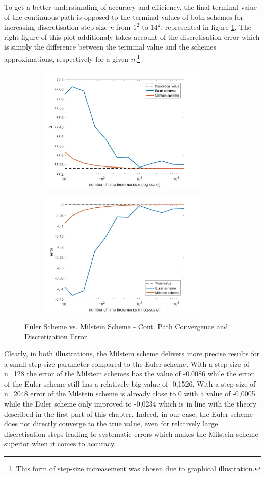 \documentclass[a4paper,11pt]{article}
\begin{document}
To get a better understanding of accuracy and efficiency, the final terminal value of the continuous path is opposed to the terminal values of both schemes for increasing discretisation step size \textit{n} from $1^2$ to $14^{2}$, represented in figure \ref{plot2}. The right figure of this plot additionaly takes account of the discretisation error which is simply the difference between the terminal value and the schemes approximations, respectively for a given \textit{n}.\footnote{This form of step-size increasement was chosen due to graphical illustration.}
\newpage
\begin{figure}[h!]
\centering
\begin{subfigure}[c]{0.5\textwidth}
\includegraphics[width=8cm]{plot12.jpeg}
\end{subfigure}
\begin{subfigure}[c]{0.4\textwidth}
\includegraphics[width=8cm]{plot13.jpeg}
\end{subfigure}
\caption{Euler Scheme vs. Milstein Scheme - Cont. Path Convergence and Discretization Error}
\label{plot2}
\end{figure}

Clearly, in both illustrations, the Milstein scheme delivers more precise results for a small step-size parameter compared to the Euler scheme. With a step-size of n=128 the error of the Milstein schemes has the value of -0.0086 while the error of the Euler scheme still has a relatively big value of -0,1526. With a step-size of n=2048 error of the Milstein scheme is already close to 0 with a value of -0,0005 while the Euler scheme only improved to -0,0234 which is in line with the theory described in the first part of this chapter. Indeed, in our case, the Euler scheme does not directly converge to the true value, even for relatively large discretisation steps leading to systematic errors which makes the Milstein scheme superior when it comes to accuracy.
\end{document}
